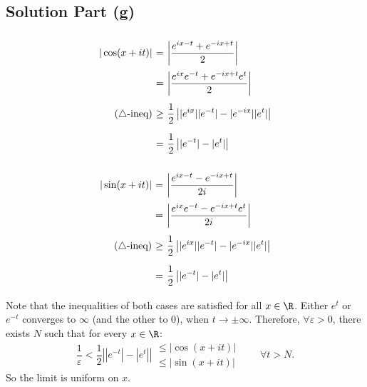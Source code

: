 \subsection*{Solution Part (g)}
\[ \everymath{\displaystyle}
\arraycolsep=1.8pt\def\arraystretch{2.5}
\begin{array}{rcl}
    |\cos(x+it)| & = & \left| \frac{e^{ix-t}+e^{-ix+t}}{2} \right|\\
    & = & \left| \frac{e^{ix}e^{-t}+e^{-ix+t}e^{t}}{2} \right|\\
    \mbox{($\triangle$-ineq)} & \geq & \frac{1}{2} \left| |e^{ix}||e^{-t}| - |e^{-ix}||e^{t}| \right|\\
    & = & \frac{1}{2}\left||e^{-t}| - |e^{t}| \right|
\end{array} \]

\[ \everymath{\displaystyle}
\arraycolsep=1.8pt\def\arraystretch{2.5}
\begin{array}{rcl}
    |\sin(x+it)| & = & \left| \frac{e^{ix-t}-e^{-ix+t}}{2i} \right|\\
    & = & \left| \frac{e^{ix}e^{-t}-e^{-ix+t}e^{t}}{2i} \right|\\
    \mbox{($\triangle$-ineq)}& \geq & \frac{1}{2} \left| |e^{ix}||e^{-t}| - |e^{-ix}||e^{t}| \right|\\
    & = & \frac{1}{2}\left||e^{-t}| - |e^{t}| \right|
\end{array} \]

Note that the inequalities of both cases are satisfied for all $x\in\R$. Either $e^t$ or $e^{-t}$ converges to $\infty$ (and the other to 0), when $t\to \pm \infty$. Therefore, $\forall \varepsilon > 0$, there exists $N$ such that for every $x\in \R$:
\[ \frac{1}{\varepsilon} < \frac{1}{2}\left||e^{-t}| - |e^{t}| \right| \begin{array}{l}
    \leq |\cos(x+it)|\\[0.7 em]
    \leq |\sin(x+it)|
\end{array}\hspace{2em} \forall t > N. \]
So the limit is uniform on $x$.